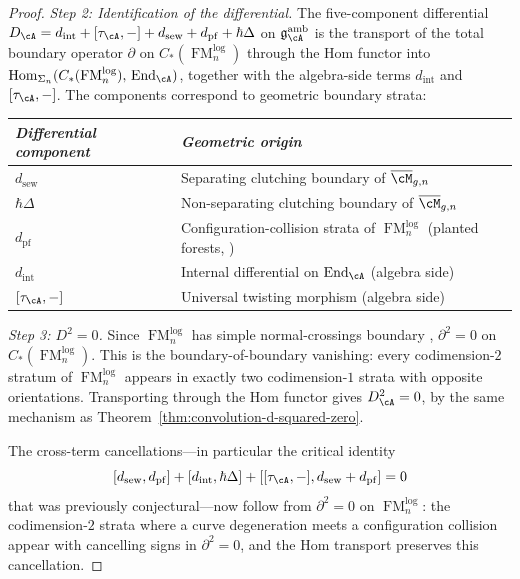 \begin{proof}
\medskip
\emph{Step 2: Identification of the differential.}
The five-component differential
$D_{\cA} = d_{\mathrm{int}} + [\tau_{\cA},-] + d_{\mathrm{sew}}
+ d_{\mathrm{pf}} + \hbar\Delta$
on $\mathfrak{g}^{\mathrm{amb}}_{\cA}$ is the transport of the
total boundary operator $\partial$ on
$C_*(\operatorname{FM}_n^{\mathrm{log}})$ through the Hom functor
into $\operatorname{Hom}_{\Sigma_n}(C_*(\operatorname{FM}_n^{\mathrm{log}}),\,
\operatorname{End}_{\cA})$,
together with the algebra-side terms $d_{\mathrm{int}}$ and
$[\tau_{\cA},-]$.  The components correspond to geometric boundary
strata:
\begin{center}
\renewcommand{\arraystretch}{1.2}
\begin{tabular}{ll}
\emph{Differential component} & \emph{Geometric origin} \\
\hline
$d_{\mathrm{sew}}$ & Separating clutching boundary of $\overline{\cM}_{g,n}$ \\
$\hbar\Delta$ & Non-separating clutching boundary of $\overline{\cM}_{g,n}$ \\
$d_{\mathrm{pf}}$ & Configuration-collision strata of $\operatorname{FM}_n^{\mathrm{log}}$
  \textup{(}planted forests, \cite[Thm~3.3.1(2)]{Mok25}\textup{)} \\
$d_{\mathrm{int}}$ & Internal differential on $\operatorname{End}_{\cA}$
  \textup{(}algebra side\textup{)} \\
$[\tau_{\cA},-]$ & Universal twisting morphism
  \textup{(}algebra side\textup{)}
\end{tabular}
\end{center}

\medskip
\emph{Step 3: $D^2 = 0$.}
Since $\operatorname{FM}_n^{\mathrm{log}}$ has simple
normal-crossings boundary \cite[Theorem~3.3.1(1)]{Mok25},
$\partial^2 = 0$ on $C_*(\operatorname{FM}_n^{\mathrm{log}})$.
This is the boundary-of-boundary vanishing: every
codimension-$2$ stratum of $\operatorname{FM}_n^{\mathrm{log}}$
appears in exactly two codimension-$1$ strata with opposite
orientations.  Transporting through the Hom functor gives
$D_{\cA}^2 = 0$, by the same mechanism as
Theorem~\ref{thm:convolution-d-squared-zero}.

The cross-term cancellations---in particular the critical identity
\[
  [d_{\mathrm{sew}}, d_{\mathrm{pf}}]
  + [d_{\mathrm{int}}, \hbar\Delta]
  + [[\tau_{\cA},-], d_{\mathrm{sew}} + d_{\mathrm{pf}}]
  = 0
\]
that was previously conjectural---now follow from
$\partial^2 = 0$ on $\operatorname{FM}_n^{\mathrm{log}}$:
the codimension-$2$ strata where a curve degeneration meets a
configuration collision appear with cancelling signs in
$\partial^2 = 0$, and the Hom transport preserves this
cancellation.


\end{proof}

